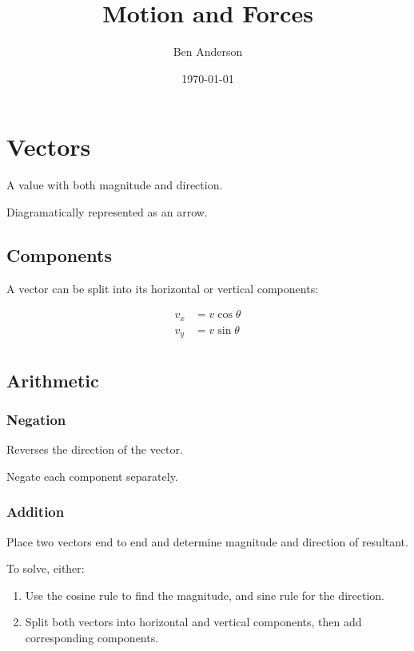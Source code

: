 \documentclass[a4paper,11pt]{article}
\begin{document}
\title{Motion and Forces}
\author{Ben Anderson}
\date{\today}
\maketitle
\pagebreak

\tableofcontents
\pagebreak


\section{Vectors}

A value with both magnitude and direction.

Diagramatically represented as an arrow.


\subsection{Components}

A vector can be split into its horizontal or vertical components:

$$
\begin{aligned}
v_x & = v \cos{\theta} \\
v_y & = v \sin{\theta} \\
\end{aligned}
$$


\subsection{Arithmetic}

\subsubsection{Negation}

Reverses the direction of the vector.

Negate each component separately.


\subsubsection{Addition}

Place two vectors end to end and determine magnitude and direction of
resultant.

To solve, either:

\begin{enumerate}
\item Use the cosine rule to find the magnitude, and sine rule for the
	direction.
\item Split both vectors into horizontal and vertical components, then add
	corresponding components.
\end{enumerate}
\end{document}
